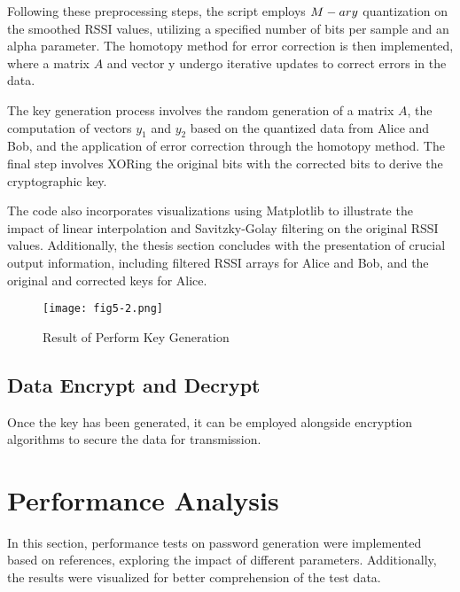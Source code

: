 Following these preprocessing steps, the script employs $M\--ary$ quantization on the smoothed RSSI values, utilizing a specified number of bits per sample and an alpha parameter. The homotopy method for error correction is then implemented, where a matrix \(A\) and vector y undergo iterative updates to correct errors in the data.

The key generation process involves the random generation of a matrix \(A\), the computation of vectors \(y_1\) and \(y_2\) based on the quantized data from Alice and Bob, and the application of error correction through the homotopy method. The final step involves XORing the original bits with the corrected bits to derive the cryptographic key.

The code also incorporates visualizations using Matplotlib to illustrate the impact of linear interpolation and Savitzky-Golay filtering on the original RSSI values. Additionally, the thesis section concludes with the presentation of crucial output information, including filtered RSSI arrays for Alice and Bob, and the original and corrected keys for Alice.
\begin{figure}
  \centering
  \texttt{[image: fig5-2.png]}
  \caption{Result of Perform Key Generation}
  \label{fig:5-2}
\end{figure}

\subsection{Data Encrypt and Decrypt}
Once the key has been generated, it can be employed alongside encryption algorithms to secure the data for transmission.

\section{Performance Analysis}
In this section, performance tests on password generation were implemented based on references, exploring the impact of different parameters. Additionally, the results were visualized for better comprehension of the test data.
